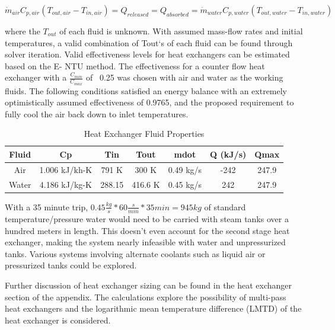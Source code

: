 \documentclass[heading.tex]{subfiles}
\begin{document}
\begin{equation*}
\dot{m}_{air} C_{p, air} (T_{out, air} - T_{in, air}) = {Q}_{released} = {Q}_{absorbed}= \dot{m}_{water} C_{p,water} (T_{out, water} - T_{in, water})
\end{equation*}

where the $T_{out}$  of each fluid is unknown. With assumed mass-flow rates and initial temperatures, a valid combination of Tout‘s of
each fluid can be found through solver iteration. Valid effectiveness levels for heat exchangers can be estimated based on the E- NTU
method. The effectiveness for a counter flow heat exchanger with a $\frac{C_{min}}{C_{max}}$ of ~0.25 was chosen with air and water as the working fluids. 
The following conditions satisfied an energy balance with an extremely optimistically assumed effectiveness of 0.9765, and the proposed requirement to fully
cool the air back down to inlet temperatures.

\begin{table} [H]
\centering
\begin{tabular}{|c|c|c|c|c|c|c|}
\hline 
Fluid & Cp & Tin & Tout & mdot & Q (kJ/s) & Qmax \\ 
\hline 
Air & 1.006 kJ/kh-K & 791 K & 300 K & 0.49 kg/s & -242 & 247.9 \\ 
\hline 
Water & 4.186 kJ/kg-K & 288.15 & 416.6 K  & 0.45 kg/s & 242 & 247.9 \\ 
\hline 
\end{tabular} 
 \caption{Heat Exchanger Fluid Properties}
\end{table}

With a 35 minute trip, $0.45 \frac{kg}{s} * 60 \frac{s}{min} * 35min = 945 kg$ of standard temperature/pressure water would need to be carried 
with steam tanks over a hundred meters in length. This doesn't even account for the second stage heat exchanger, making the system nearly infeasible
with water and unpressurized tanks. Various systems involving alternate coolants such as liquid air or pressurized tanks could be explored.

Further discussion of heat exchanger sizing can be found in the heat exchanger section of the appendix.
The calculations explore the possibility of multi-pass heat exchangers
and the logarithmic mean temperature difference (LMTD) of the heat exchanger is considered.
\end{document}

